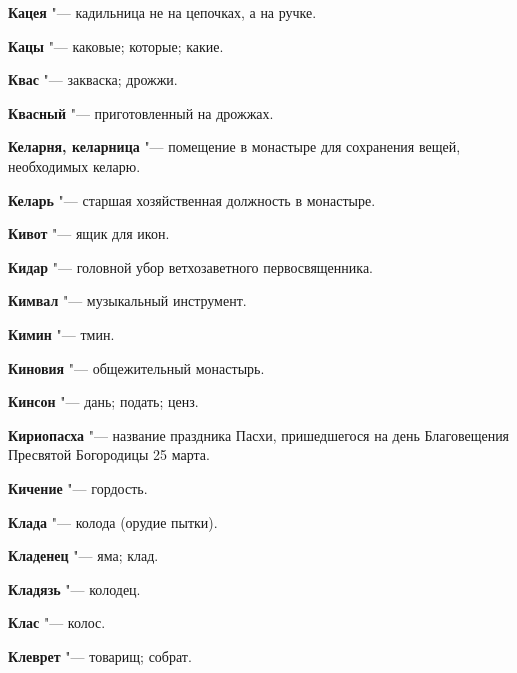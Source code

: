 \begin{mymulticols}{2}
\noindent\textbf{Кацея} "--- кадильница не на цепочках, а на ручке. 




\noindent\textbf{Кацы} "--- каковые; которые; какие. 




\noindent\textbf{Квас} "--- закваска; дрожжи. 




\noindent\textbf{Квасный} "--- приготовленный на дрожжах. 




\noindent\textbf{Келарня, келарница} "--- помещение в монастыре для сохранения вещей, необходимых келарю. 




\noindent\textbf{Келарь} "--- старшая хозяйственная должность в монастыре. 




\noindent\textbf{Кивот} "--- ящик для икон. 




\noindent\textbf{Кидар} "--- головной убор ветхозаветного первосвященника. 




\noindent\textbf{Кимвал} "--- музыкальный инструмент. 




\noindent\textbf{Кимин} "--- тмин. 




\noindent\textbf{Киновия} "--- общежительный монастырь. 




\noindent\textbf{Кинсон} "--- дань; подать; ценз. 




\noindent\textbf{Кириопасха} "--- название праздника Пасхи, пришедшегося на день Благовещения Пресвятой Богородицы 25 марта. 




\noindent\textbf{Кичение} "--- гордость. 




\noindent\textbf{Клада} "--- колода (орудие пытки). 




\noindent\textbf{Кладенец} "--- яма; клад. 




\noindent\textbf{Кладязь} "--- колодец. 




\noindent\textbf{Клас} "--- колос. 




\noindent\textbf{Клеврет} "--- товарищ; собрат. 





\end{mymulticols}
